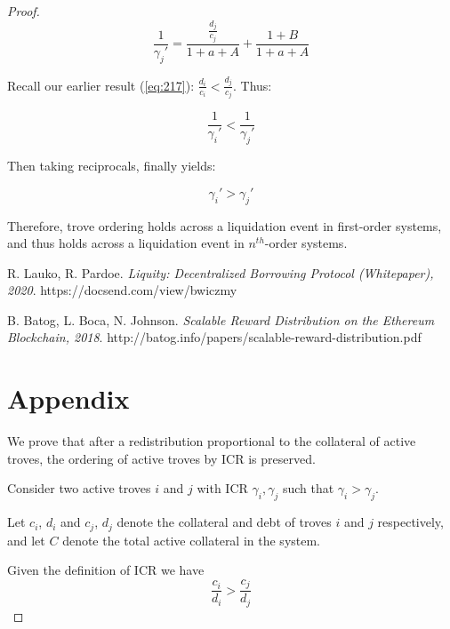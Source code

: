 \documentclass[reqno]{article}
\begin{document}
\begin{proof}
\begin{equation} 
    \frac{1}{\gamma_{j}'}=\frac{\frac{d_j}{c_j}}{1+a+A}+\frac{1+B}{1+a+A}
\end{equation}

\bigskip
Recall our earlier result (\ref{eq:217}): $\frac{d_i}{c_i}<\frac{d_j}{c_j}$. Thus:

\begin{equation} 
    \frac{1}{\gamma_{i}'} < \frac{1}{\gamma_{j}'}
\end{equation}

\bigskip
Then taking reciprocals, finally yields:

\begin{equation} 
    \gamma_{i}' > \gamma_{j}'
\end{equation}

\bigskip
Therefore, trove ordering holds across a liquidation event in first-order systems, and thus holds across a liquidation event in $n^{th}$-order systems.

\bigskip

\begin{thebibliography}{9}

R. Lauko, R. Pardoe. 
\textit{Liquity: Decentralized Borrowing Protocol (Whitepaper), 2020}. 
https://docsend.com/view/bwiczmy

B. Batog, L. Boca, N. Johnson.
\textit{Scalable Reward Distribution on the Ethereum Blockchain, 2018}. 
http://batog.info/papers/scalable-reward-distribution.pdf


\end{thebibliography}

\pagebreak
\section{Appendix} \label{sec:appendix}
We prove that after a redistribution proportional to the collateral of active troves, the ordering of active troves by ICR is preserved. 

Consider two active troves $i$ and $j$ with ICR $\gamma_i,  \gamma_j$ such that $\gamma_i > \gamma_j$.

Let $c_i$, $d_i$ and $c_j$, $d_j$ denote the collateral and debt of troves $i$ and $j$ respectively, and let $C$ denote the total active collateral in the system.

Given the definition of ICR we have 
\begin{equation} \label{eq:92}
    \frac{c_i}{d_i}>\frac{c_j}{d_j}
\end{equation}


\end{proof}
\end{document}
